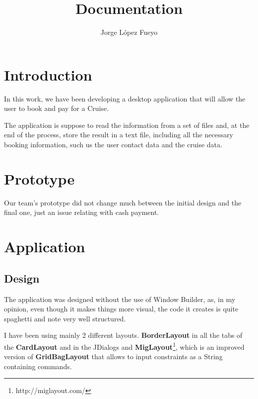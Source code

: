 \documentclass{article}
\title{Documentation}
\author{Jorge López Fueyo}
\begin{document}
   \maketitle
   \newpage
     
   \section{Introduction}
   
   In this work, we have been developing a desktop application that will allow the user to book and pay for a Cruise.

   The application is suppose to read the information from a set of files and, at the end of the process, store the result in a text file, including all the necessary booking information, such us the user contact data and the cruise data.
   
   \section{Prototype}
   Our team's prototype did not change much between the initial design and the final one, just an issue relating with cash payment.
   
   \section{Application}
   \subsection{Design}
   The application was designed without the use of Window Builder, as, in my opinion, even though it makes things more visual, the code it creates is quite spaghetti and note very well structured.
   
   I have been using mainly 2 different layouts. \textbf{BorderLayout} in all the tabs of the \textbf{CardLayout} and in the JDialogs and \textbf{MigLayout}\footnote{http://miglayout.com/}, which is an improved  version of \textbf{GridBagLayout} that allows to input constraints as a String containing commands.
   
\end{document}
